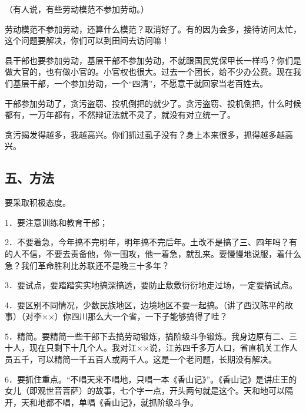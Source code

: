 （有人说，有些劳动模范不参加劳动。）

劳动模范不参加劳动，还算什么模范？取消好了。有的因为会多，接待访问太忙，这个问题要解决，你们可以到田间去访问嘛！

县干部也要参加劳动，基层干部不参加劳动，不就跟国民党保甲长一样吗？你们是做大官的，也有做小官的。小官权也很大。过去一个团长，给不少办公费。现在我们基层干部，一个参加劳动，一个“四清”，不愿意干就回家当老百姓去。

干部参加劳动了，贪污盗窃、投机倒把的就少了。贪污盗窃、投机倒把，什么时候都有，一万年都有，不然辩证法就不灵了，就没有对立统一了。

贪污揭发得越多，我越高兴。你们抓过虱子没有？身上本来很多，抓得越多越高兴。

\subsection{五、方法}

要采取积极态度。

1．要注意训练和教育干部；

2．不要着急，今年搞不完明年，明年搞不完后年。土改不是搞了三、四年吗？有的人不信，不要去责备他，你一围攻，他一着急，就乱来。要慢慢地说服，着什么急？我们革命胜利比苏联还不是晚三十多年？

3．要试点，要踏踏实实地搞深搞透，要防止敷敷衍衍地走过场，一定要搞试点。

4．要区别不同情况，少数民族地区，边境地区不要一起搞。（讲了西汉陈平的故事）（对李××）你四川那么大一个省，一下子能够搞得了哇？

5．精简。要精简一些干部下去搞劳动锻炼，搞阶级斗争锻炼。我身边原有二、三十人，现在只剩下十几个人。我对江××说，江苏四千多万人口，省直机关工作人员五千，可以精简一千五百人或两千人。这是一个老问题，长期没有解决。

6．要抓住重点。“不唱天来不唱地，只唱一本《香山记》”。《香山记》是讲庄王的女儿（即观世音菩萨）的故事，七个字一点，开头两句就是这个。天和地可以隔开，天和地都不唱，单唱《香山记》，就抓阶级斗争。

